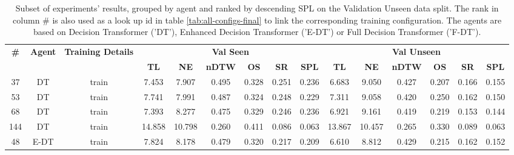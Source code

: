 \begin{table}
\centering
\caption{\label{tab:reward_scale}Subset of experiments' results, grouped by agent and ranked by descending SPL on the Validation Unseen data split. The rank in column \# is also used as a look up id in table \ref{tab:all-configs-final} to link the corresponding training configuration.     \newline The agents are based on Decision Transformer ('DT'), Enhanced Decision Transformer ('E-DT') or Full Decision Transformer ('F-DT').}
\begin{tabular}{@{\hskip3pt}c@{\hskip3pt}c@{\hskip3pt}c@{\hskip3pt}c@{\hskip3pt}c@{\hskip3pt}c@{\hskip3pt}c@{\hskip3pt}c@{\hskip3pt}c@{\hskip3pt}c@{\hskip3pt}c@{\hskip3pt}c@{\hskip3pt}c@{\hskip3pt}c@{\hskip3pt}c}
\toprule
\textbf{\#} & \textbf{Agent} & \textbf{Training Details} & \multicolumn{6}{c}{\textbf{Val Seen}} & \multicolumn{6}{c}{\textbf{Val Unseen}} \\
\cmidrule(l){4-9} \cmidrule(l){10-15} \textbf{~} &     \textbf{~} &                \textbf{~} &       \textbf{TL} & \textbf{NE} & \textbf{nDTW} & \textbf{OS} & \textbf{SR} & \textbf{SPL} &         \textbf{TL} & \textbf{NE} & \textbf{nDTW} & \textbf{OS} & \textbf{SR} & \textbf{SPL} \\
\midrule
         37 &             DT &                     train &             7.453 &       7.907 &         0.495 &       0.328 &       0.251 &        0.236 &               6.683 &       9.050 &         0.427 &       0.207 &       0.166 &        0.155 \\
         53 &             DT &                     train &             7.741 &       7.991 &         0.487 &       0.324 &       0.248 &        0.229 &               7.311 &       9.058 &         0.420 &       0.250 &       0.162 &        0.150 \\
         68 &             DT &                     train &             7.393 &       8.277 &         0.475 &       0.329 &       0.246 &        0.236 &               6.921 &       9.161 &         0.419 &       0.219 &       0.153 &        0.144 \\
        144 &             DT &                     train &            14.858 &      10.798 &         0.260 &       0.411 &       0.086 &        0.063 &              13.867 &      10.457 &         0.265 &       0.330 &       0.089 &        0.063 \\
         48 &           E-DT &                     train &             7.824 &       8.178 &         0.479 &       0.320 &       0.217 &        0.209 &               6.610 &       8.812 &         0.429 &       0.215 &       0.162 &        0.152 \\

\end{tabular}
\end{table}
